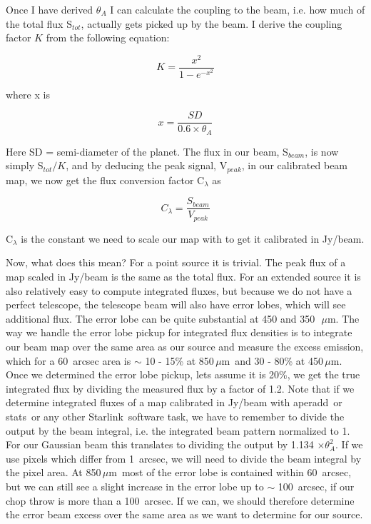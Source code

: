 \documentclass[twoside,11pt]{article}
\newcommand{\mic}{\mbox{\,${\mu}$m}}               %
\newcommand{\starlink}{\htmladdnormallink{Starlink}{http://star-www.rl.ac.uk/}}
\newcommand{\task}[1]{\textsf{#1}}
\newcommand{\aperadd}{\xref{\task{aperadd}}{sun95}{APERADD}}
\newcommand{\stats}{\xref{\task{stats}}{sun95}{STATS}}
\newcommand{\htmladdnormallink}[2]{#1}
\newcommand{\xref}[3]{#1}
\begin{document}
{Once I have derived $\theta_A$ I can calculate the coupling to the beam,
i.e. how much of the total flux S$_{tot}$, actually gets picked up by
the beam.  I derive the coupling factor $K$ from the following equation:

\begin{equation}
K = \frac{x^2}{1 - e^{-x^2}}
\end{equation}

where x is

\begin{equation}
x = \frac{SD}{0.6 \times \theta_A}
\end{equation}

Here SD = semi-diameter of the planet. The flux in our beam, S$_{beam}$, is
now simply S$_{tot}/K$, and by deducing the peak signal, V$_{peak}$,
in our calibrated beam map, we now get the flux conversion factor
C$_{\lambda}$ as

\begin{equation}
C_{\lambda} = \frac {S_{beam}}{V_{peak}}
\end{equation}

C$_{\lambda}$ is the constant we need to scale our map with to get
it calibrated in Jy/beam.

Now, what does this mean? For a point source it is trivial. The peak
flux of a map scaled in Jy/beam is the same as the
total flux. For an extended source it is also relatively easy to compute
integrated fluxes, but because we do not have a perfect telescope, the
telescope beam will also have error lobes, which will see additional
flux. The error lobe can be quite substantial at 450 and 350~\mic. The
way we handle the error lobe pickup for integrated flux densities is to
integrate our beam map over the same area as our source and measure the
excess emission, which for a 60~arcsec area is $\sim$ 10 - 15\% at 850\mic\
and 30 - 80\% at 450\mic. Once we determined the error lobe pickup,
lets assume it is 20\%, we get the true integrated flux by dividing the
measured flux by a factor of 1.2. Note that if we determine integrated
fluxes of a map calibrated in Jy/beam with \aperadd\ or
\stats\ or any other \starlink\ software task, we have to remember to
divide the output by the beam integral, i.e. the integrated beam pattern
normalized to 1. For our Gaussian beam this translates to dividing
the output by 1.134 $\times \theta_{A}^{2}$. If we use pixels which differ
from 1~arcsec, we will need to divide the beam integral by the pixel area.
At 850\mic\ most of the error lobe is contained within 60~arcsec, but we can still 
see a slight increase in the error lobe up to $\sim$ 100~arcsec, if our chop
throw is more than a 100~arcsec. If we can, we should therefore determine the
error beam excess over the same area as we want to determine for our
source.

}
\end{document}
